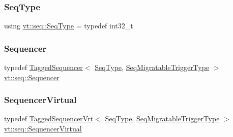 \mbox{\label{namespacevt_1_1seq_a3b612da217ac669d39c159f134ab8434}} 
\subsubsection{\texorpdfstring{Seq\+Type}{SeqType}}
{\footnotesize\ttfamily using \hyperlink{namespacevt_1_1seq_a3b612da217ac669d39c159f134ab8434}{vt\+::seq\+::\+Seq\+Type} = typedef int32\+\_\+t}

\mbox{\label{namespacevt_1_1seq_a3036b47f9709f15f8a873c5c6b6b7db1}} 
\subsubsection{\texorpdfstring{Sequencer}{Sequencer}}
{\footnotesize\ttfamily typedef \hyperlink{structvt_1_1seq_1_1_tagged_sequencer}{Tagged\+Sequencer}$<$ \hyperlink{namespacevt_1_1seq_a3b612da217ac669d39c159f134ab8434}{Seq\+Type}, \hyperlink{namespacevt_1_1seq_aab252d92ce46371ce1b307eeb524f030}{Seq\+Migratable\+Trigger\+Type} $>$ \hyperlink{namespacevt_1_1seq_a3036b47f9709f15f8a873c5c6b6b7db1}{vt\+::seq\+::\+Sequencer}}

\mbox{\label{namespacevt_1_1seq_a2fa3e09bce83c402f60291f7197253ec}} 
\subsubsection{\texorpdfstring{Sequencer\+Virtual}{SequencerVirtual}}
{\footnotesize\ttfamily typedef \hyperlink{structvt_1_1seq_1_1_tagged_sequencer_vrt}{Tagged\+Sequencer\+Vrt}$<$ \hyperlink{namespacevt_1_1seq_a3b612da217ac669d39c159f134ab8434}{Seq\+Type}, \hyperlink{namespacevt_1_1seq_aab252d92ce46371ce1b307eeb524f030}{Seq\+Migratable\+Trigger\+Type} $>$ \hyperlink{namespacevt_1_1seq_a2fa3e09bce83c402f60291f7197253ec}{vt\+::seq\+::\+Sequencer\+Virtual}}

\mbox{\label{namespacevt_1_1seq_a80eeb50c74a4a3bd46fcf4d5213c5ebe}} 
